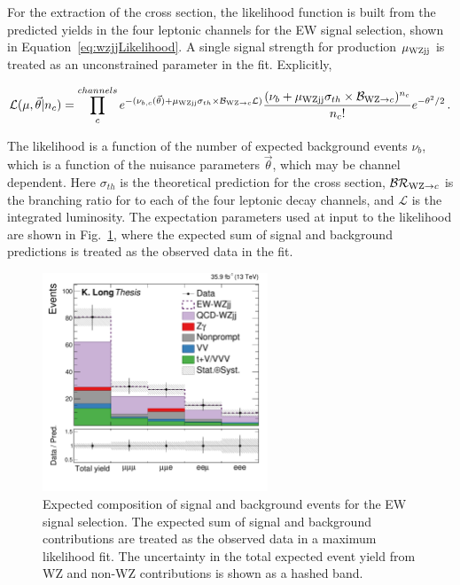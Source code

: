 For the extraction of the \WZjj cross section, the likelihood function is built
from the predicted yields in the four leptonic channels for the EW signal selection,
shown in Equation~\ref{eq:wzjjLikelihood}.
A single signal strength for \WZjj production $\mu_{\rm {WZjj}}$ is treated as an unconstrained parameter in the fit.
Explicitly,

\begin{equation}
  \mathcal{L}(\mu, \vec{\theta} | n_{c}) = 
    \prod_{c}^{channels} e^{-(\nu_{b, c}(\vec{\theta}) + 
    \mu_{\rm {WZjj}}\sigma_{th}\times\mathcal{B}_{\mathrm{W}\mathrm{Z} \rightarrow c} \mathcal{L})}
    \frac{(\nu_{b} + \mu_{\rm {WZjj}}\sigma_{th} 
    \times\mathcal{B}_{\mathrm{W}\mathrm{Z} \rightarrow c})^{n_{c}}}{n_{c}!} 
    e^{-\theta^2/2} \,.
    \label{eq:wzjjLikelihood}
\end{equation}

The likelihood is a function of the number of expected background events $\nu_{b}$, which is
a function of the nuisance parameters $\vec{\theta}$, which may be channel dependent. Here
$\sigma_{th}$ is the theoretical prediction for the \WZjj cross section, 
$\mathcal{BR}_{\mathrm{W}\mathrm{Z} \rightarrow c}$ is the branching ratio for \WZ to each of the four leptonic decay
channels, and $\mathcal{L}$ is the integrated luminosity. The expectation parameters used at input to the likelihood are shown
in Fig.~\ref{fig:expectedEWSignal}, where the expected sum of signal and background
predictions is treated as the observed data in the fit.

\begin{figure}[htbp]
  \centering
   \includegraphics[width=0.6\textwidth]{figures/AnalysisProcedure/expectedYield_EWSignal.pdf}
  \caption{
    Expected composition of signal and background events for the EW signal selection.
    The expected sum of signal and background contributions are treated as the observed
    data in a maximum likelihood fit. The uncertainty in the total expected event yield
    from WZ and non-WZ contributions is shown as a hashed band.
        }
 \label{fig:expectedEWSignal}
\end{figure}

